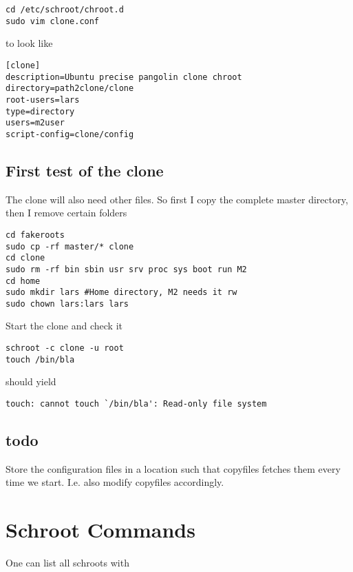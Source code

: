 \documentclass[a4paper]{article}
\begin{document}
\begin{verbatim}
cd /etc/schroot/chroot.d
sudo vim clone.conf
\end{verbatim}

to look like

\begin{verbatim}
[clone]
description=Ubuntu precise pangolin clone chroot
directory=path2clone/clone
root-users=lars
type=directory
users=m2user
script-config=clone/config
\end{verbatim}

\subsection{First test of the clone}

The clone will also need other files. So first I copy the complete master directory, then I remove certain folders

\begin{verbatim}
cd fakeroots
sudo cp -rf master/* clone
cd clone
sudo rm -rf bin sbin usr srv proc sys boot run M2
cd home
sudo mkdir lars #Home directory, M2 needs it rw
sudo chown lars:lars lars
\end{verbatim}

Start the clone and check it

\begin{verbatim}
schroot -c clone -u root
touch /bin/bla
\end{verbatim}

should yield

\begin{verbatim}
touch: cannot touch `/bin/bla': Read-only file system
\end{verbatim}

\subsection{todo}

Store the configuration files in a location such that copyfiles fetches them every time we start. I.e. also modify copyfiles accordingly.

\section{Schroot Commands}
One can list all schroots with
\end{document}
